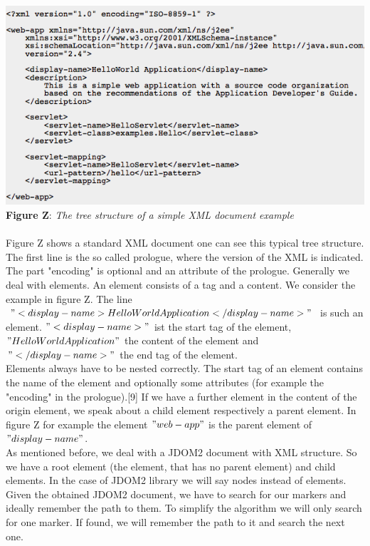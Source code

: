 \\ \\ \includegraphics[width=1.0\textwidth]{xml_sample.png}  \\\textbf{Figure Z}: \textit{The tree structure of a simple XML document example}  \\ \\  Figure Z shows a standard XML document one can see this typical tree structure. The first line is the so called prologue, where the version of the XML is indicated. The part "encoding" is optional and an attribute of the prologue. Generally we deal with elements. An element consists of a tag and a content. We consider the example in figure Z. The line  $"<display-name>HelloWorld Application</display-name>"$ is such an element. $"<display-name>"$ ist the start tag of the element, $"HelloWorld Application"$ the content of the element and $"</display-name>"$ the end tag of the element. \\ Elements always have to be nested correctly. The start tag of an element contains the name of the element and optionally some attributes (for example the "encoding" in the prologue).[9] If we have a further element in the content of the origin element, we speak about a child element respectively a parent element. In figure Z for example the element $"web-app"$ is the parent element of $"display-name"$.\\ As mentioned before, we deal with a JDOM2 document with XML structure. So we have a root element (the element, that has no parent element) and child elements. In the case of JDOM2 library we will say nodes instead of elements.\\ Given the obtained JDOM2 document, we have to search for our markers and ideally remember the path to them. To simplify the algorithm we will only search for one marker. If found, we will remember the path to it and search the next one.  \\





